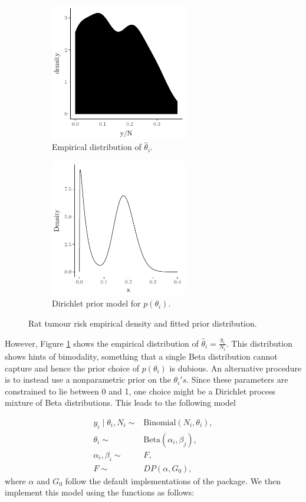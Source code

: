 \documentclass[nojss]{jss}
\begin{document}
\begin{figure}[tb]
\begin{subfigure}[b]{0.5\textwidth}
	\centering
	\includegraphics[height=60mm, width=60mm]{img/ratsImpericalDistribution.pdf}
	\caption{Empirical distribution of $\hat{\theta}_i$.}
	\label{fig:ratsImperical}
\end{subfigure}
\begin{subfigure}[b]{0.5\textwidth}
	\centering
	\includegraphics[height=60mm, width=60mm]{img/ratsDirichletPrior.pdf}
	\caption{Dirichlet prior model for $p(\theta _i)$.}
	\label{fig:rats_dirichlet_model}
\end{subfigure}
\caption{Rat tumour risk empirical density and fitted prior distribution.}
\end{figure}

However, Figure \ref{fig:ratsImperical} shows the empirical distribution of $\hat{\theta}_i = \frac{y_i}{N_i}$. This distribution shows hints of bimodality, something that a single Beta distribution cannot capture and hence the prior choice of $p(\theta_i)$ is dubious.
An alternative procedure is to instead use a nonparametric prior on the $\theta_i's$. Since these parameters are constrained to lie between 0 and 1, one choice might be a Dirichlet process mixture of Beta distributions. This leads to the following model

\begin{align*}
y_i \mid \theta_i, N_i \sim & \text{Binomial}(N_i,\theta_i), \\
\theta_i \sim & \text{Beta}(\alpha_i, \beta_j), \\
\alpha _i, \beta _i \sim & F, \\
F \sim & DP(\alpha, G_0),
\end{align*}
where $\alpha$ and $G_0$ follow the default implementations of the  package. We then implement this model using the  functions as follows:
\clearpage
\end{document}
